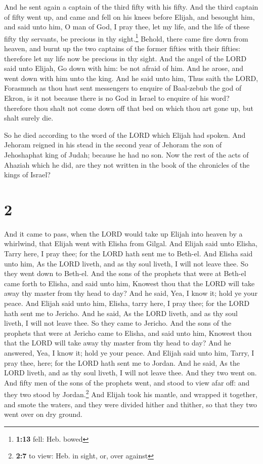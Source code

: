  And he sent again a captain of the third fifty with his
fifty. And the third captain of fifty went up, and came and fell on his
knees before Elijah, and besought him, and said unto him, O man of God,
I pray thee, let my life, and the life of these fifty thy servants, be
precious in thy sight.\footnote{\textbf{1:13} fell: Heb. bowed}
 Behold, there came fire down from heaven, and burnt up
the two captains of the former fifties with their fifties: therefore let
my life now be precious in thy sight.  And the angel of
the LORD said unto Elijah, Go down with him: be not afraid of him. And
he arose, and went down with him unto the king.  And he
said unto him, Thus saith the LORD, Forasmuch as thou hast sent
messengers to enquire of Baal-zebub the god of Ekron, is it not because
there is no God in Israel to enquire of his word? therefore thou shalt
not come down off that bed on which thou art gone up, but shalt surely
die.

 So he died according to the word of the LORD which
Elijah had spoken. And Jehoram reigned in his stead in the second year
of Jehoram the son of Jehoshaphat king of Judah; because he had no son.
 Now the rest of the acts of Ahaziah which he did, are
they not written in the book of the chronicles of the kings of Israel?

\hypertarget{section-1}{%
\section{2}\label{section-1}}

 And it came to pass, when the LORD would take up Elijah
into heaven by a whirlwind, that Elijah went with Elisha from Gilgal.
 And Elijah said unto Elisha, Tarry here, I pray thee; for
the LORD hath sent me to Beth-el. And Elisha said unto him, As the LORD
liveth, and as thy soul liveth, I will not leave thee. So they went down
to Beth-el.  And the sons of the prophets that were at
Beth-el came forth to Elisha, and said unto him, Knowest thou that the
LORD will take away thy master from thy head to day? And he said, Yea, I
know it; hold ye your peace.  And Elijah said unto him,
Elisha, tarry here, I pray thee; for the LORD hath sent me to Jericho.
And he said, As the LORD liveth, and as thy soul liveth, I will not
leave thee. So they came to Jericho.  And the sons of the
prophets that were at Jericho came to Elisha, and said unto him, Knowest
thou that the LORD will take away thy master from thy head to day? And
he answered, Yea, I know it; hold ye your peace.  And
Elijah said unto him, Tarry, I pray thee, here; for the LORD hath sent
me to Jordan. And he said, As the LORD liveth, and as thy soul liveth, I
will not leave thee. And they two went on.  And fifty men
of the sons of the prophets went, and stood to view afar off: and they
two stood by Jordan.\footnote{\textbf{2:7} to view: Heb. in sight, or,
  over against}  And Elijah took his mantle, and wrapped
it together, and smote the waters, and they were divided hither and
thither, so that they two went over on dry ground.


